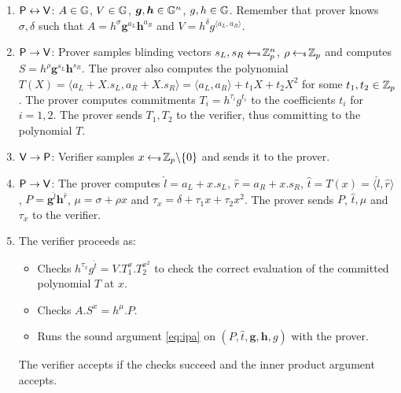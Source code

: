 \documentclass[11pt]{article}
\begin{document}
\begin{enumerate}[{\rm 1.}]
\item $\mathsf{P}\leftrightarrow \mathsf{V}$: $A\in \mathbb{G}$, $V\in \mathbb{G}$,
$\bm{g},\bm{h}\in \mathbb{G}^n$, $g,h\in \mathbb{G}$. Remember that prover knows
$\sigma,\delta$ such that $A=h^\sigma\bm{g}^{a_L}\bm{h}^{a_R}$ and $V=h^\delta
g^{\langle a_L,a_R\rangle}$.  

\item $\mathsf{P}\rightarrow \mathsf{V}$: Prover samples blinding vectors
$s_L,s_R\hskip2.3pt{\gets\!\!\mbox{\tiny${\$}$\normalsize}}\, \mathbb{Z}_p^n$, $\rho\hskip2.3pt{\gets\!\!\mbox{\tiny${\$}$\normalsize}}\, \mathbb{Z}_p$ and computes
$S=h^\rho\bm{g}^{s_L}\bm{h}^{s_R}$. The prover also computes the polynomial
$T(X) = \langle a_L + X.s_L, a_R + X.s_R \rangle = \langle a_L, a_R
\rangle + t_1X+t_2X^2$ for some $t_1,t_2\in \mathbb{Z}_p$. The prover computes
commitments $T_i=h^{\tau_i}g^{t_i}$ to the coefficients $t_i$ for $i=1,2$. The
prover sends $T_1,T_2$ to the verifier, thus committing to the polynomial
$T$.


\item $\mathsf{V}\rightarrow \mathsf{P}$: Verifier samples $x\hskip2.3pt{\gets\!\!\mbox{\tiny${\$}$\normalsize}}\,
\mathbb{Z}_p\backslash \{0\}$ and sends it to the prover.

\item $\mathsf{P}\rightarrow \mathsf{V}$: The prover computes $\hat{l}=a_L+x.s_L$,
$\hat{r}=a_R+x.s_R$, $\hat{t}=T(x)=\langle \hat{l},\hat{r}\rangle$,
$P=\bm{g}^{\hat{l}}\bm{h}^{\hat{r}}$, $\mu=\sigma+\rho x$ and $\tau_x = \delta
+ \tau_1 x + \tau_2x^2$. The prover sends $P$, $\hat{t}, \mu$ and $\tau_x$ to the verifier.

\item The verifier proceeds as:
  \begin{itemize}
    \item Checks $h^{\tau_x}g^{\hat{t}} = V.T_1^x.T_2^{x^2}$ to check the
correct evaluation of the committed polynomial $T$ at $x$.
    \item Checks $A.S^x=h^\mu.P$.
    \item Runs the sound argument \eqref{eq:ipa} on $(P,\hat{t},\bm{g},\bm{h},g)$ with the prover.
  \end{itemize}
  The verifier accepts if the checks succeed and the inner product argument
accepts.
\end{enumerate}
\end{document}
